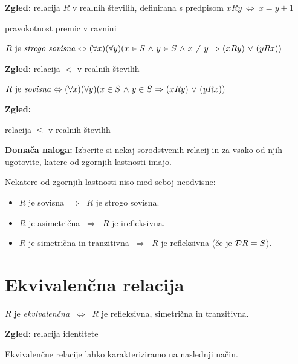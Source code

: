 \documentclass[11pt,paper=b5,footinclude,headinclude]{scrbook} %
\def\ali {{~\vee~}}
\def\inn {{~\wedge~}}
\def\sledi {{~\Rightarrow~}}
\def\cee {{~\Leftrightarrow~}}
\begin{document}

\textbf{ Zgled:}
relacija $R$ v realnih številih, definirana s predpisom $xRy \cee x = y + 1$

pravokotnost premic v ravnini

\bigskip

$R \textrm{ je {\em strogo sovisna}} \cee (\forall x)(\forall y)(x\in S\inn y\in S
\inn x\neq y\sledi (xRy)\ali (yRx))$


\textbf{ Zgled:}
relacija $<$ v realnih  številih

\bigskip

$R \textrm{ je {\em sovisna}} \cee (\forall x)(\forall y)(x\in S\inn y\in S
\sledi (xRy)\ali (yRx))$


\textbf{ Zgled:}

relacija $\le$ v realnih številih

\bigskip
\textbf{ Domača naloga:}
Izberite si nekaj sorodstvenih relacij in za vsako od njih ugotovite, katere od zgornjih lastnosti imajo.

\bigskip
Nekatere od zgornjih lastnosti niso med seboj neodvisne:
\begin{itemize}
  \item $R$ je sovisna $\sledi$ $R$ je strogo sovisna.
  \item $R$ je asimetrična $\sledi$ $R$ je irefleksivna.
  \item $R$ je simetrična in tranzitivna $\sledi$ $R$ je refleksivna (če je ${\cal D}R = S$).
\end{itemize}

\section{Ekvivalenčna relacija}

$R$ je {\em ekvivalenčna} $\cee$ $R$ je refleksivna, simetrična in tranzitivna.

\textbf{ Zgled:} relacija identitete

\bigskip
Ekvivalenčne relacije lahko karakteriziramo na naslednji način.
\end{document}
